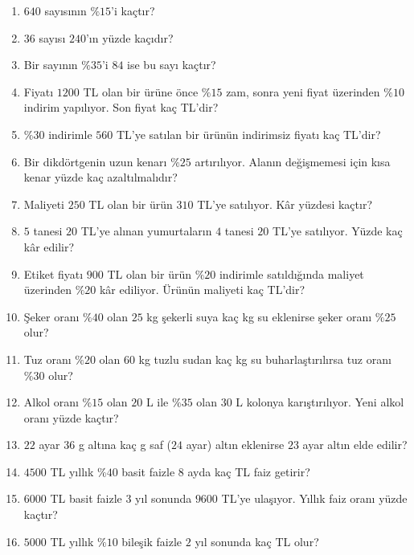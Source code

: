 \begin{enumerate}[label=\textbf{\arabic*.},leftmargin=*,itemsep=6pt]
\item \(640\) sayısının \(\%15\)'i kaçtır?
\item \(36\) sayısı \(240\)'ın yüzde kaçıdır?
\item Bir sayının \(\%35\)'i \(84\) ise bu sayı kaçtır?
\item Fiyatı \(1200\) TL olan bir ürüne önce \(\%15\) zam, sonra yeni fiyat üzerinden \(\%10\) indirim yapılıyor. Son fiyat kaç TL'dir?
\item \(\%30\) indirimle \(560\) TL'ye satılan bir ürünün indirimsiz fiyatı kaç TL'dir?
\item Bir dikdörtgenin uzun kenarı \(\%25\) artırılıyor. Alanın değişmemesi için kısa kenar yüzde kaç azaltılmalıdır?
\item Maliyeti \(250\) TL olan bir ürün \(310\) TL'ye satılıyor. Kâr yüzdesi kaçtır?
\item \(5\) tanesi \(20\) TL'ye alınan yumurtaların \(4\) tanesi \(20\) TL'ye satılıyor. Yüzde kaç kâr edilir?
\item Etiket fiyatı \(900\) TL olan bir ürün \(\%20\) indirimle satıldığında maliyet üzerinden \(\%20\) kâr ediliyor. Ürünün maliyeti kaç TL'dir?
\item Şeker oranı \(\%40\) olan \(25\) kg şekerli suya kaç kg su eklenirse şeker oranı \(\%25\) olur?
\item Tuz oranı \(\%20\) olan \(60\) kg tuzlu sudan kaç kg su buharlaştırılırsa tuz oranı \(\%30\) olur?
\item Alkol oranı \(\%15\) olan \(20\) L ile \(\%35\) olan \(30\) L kolonya karıştırılıyor. Yeni alkol oranı yüzde kaçtır?
\item \(22\) ayar \(36\) g altına kaç g saf (\(24\) ayar) altın eklenirse \(23\) ayar altın elde edilir?
\item \(4500\) TL yıllık \(\%40\) basit faizle \(8\) ayda kaç TL faiz getirir?
\item \(6000\) TL basit faizle \(3\) yıl sonunda \(9600\) TL'ye ulaşıyor. Yıllık faiz oranı yüzde kaçtır?
\item \(5000\) TL yıllık \(\%10\) bileşik faizle \(2\) yıl sonunda kaç TL olur?
\end{enumerate}

